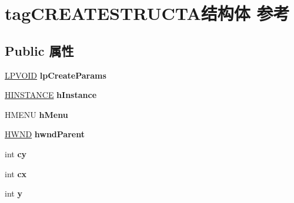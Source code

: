 \hypertarget{structtag_c_r_e_a_t_e_s_t_r_u_c_t_a}{}\section{tag\+C\+R\+E\+A\+T\+E\+S\+T\+R\+U\+C\+T\+A结构体 参考}
\label{structtag_c_r_e_a_t_e_s_t_r_u_c_t_a}
\subsection*{Public 属性}
\begin{DoxyCompactItemize}
\item 
\mbox{\label{structtag_c_r_e_a_t_e_s_t_r_u_c_t_a_aafbcb9457dcae7894b3c82979e3f031b}} 
\hyperlink{interfacevoid}{L\+P\+V\+O\+ID} {\bfseries lp\+Create\+Params}
\item 
\mbox{\label{structtag_c_r_e_a_t_e_s_t_r_u_c_t_a_a7a380f450f4d138cbba5c7b7cbea7489}} 
\hyperlink{interfacevoid}{H\+I\+N\+S\+T\+A\+N\+CE} {\bfseries h\+Instance}
\item 
\mbox{\label{structtag_c_r_e_a_t_e_s_t_r_u_c_t_a_a20776c1f3f7f9b69c923e353b11dc4a3}} 
H\+M\+E\+NU {\bfseries h\+Menu}
\item 
\mbox{\label{structtag_c_r_e_a_t_e_s_t_r_u_c_t_a_a53b6249a3b804dbff5b87e5215cabd04}} 
\hyperlink{interfacevoid}{H\+W\+ND} {\bfseries hwnd\+Parent}
\item 
\mbox{\label{structtag_c_r_e_a_t_e_s_t_r_u_c_t_a_ad4eb5c0be2e988acb9ecc9edce01966f}} 
int {\bfseries cy}
\item 
\mbox{\label{structtag_c_r_e_a_t_e_s_t_r_u_c_t_a_a735f4957e39514af74ee269d1745f6c5}} 
int {\bfseries cx}
\item 
\mbox{\label{structtag_c_r_e_a_t_e_s_t_r_u_c_t_a_a25ee2b2176b6b6ff1684dc1a530bb8ed}} 
int {\bfseries y}
\item 
\mbox{\label{structtag_c_r_e_a_t_e_s_t_r_u_c_t_a_a2159eacdb560c572d3e1ac2f0fdfda56}} 

\end{DoxyCompactItemize}
